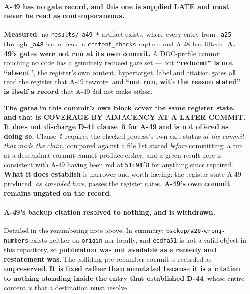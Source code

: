 \documentclass[
  10pt,
]{article}
\begin{document}
\paragraph{A-49 has no gate record, and this one is supplied LATE and must never be read as contemporaneous.}
\textbf{Measured}: no \texttt{results/\allowbreak{}\_a49\_*} artifact exists, where every entry from \texttt{\_a25} through \texttt{\_a48} has at least a \texttt{content\_checks} capture and A-48 has fifteen. \textbf{A-49's gates were not run at its own commit.} A DOC-profile commit touching no code has a genuinely reduced gate set --- but \textbf{``reduced'' is not ``absent''}, the register's own content, hypertarget, label and citation gates all read the register that A-49 rewrote, and \textbf{``not run, with the reason stated'' is itself a record} that A-49 did not make either.

\textbf{The gates in this commit's own block cover the same register state, and that is COVERAGE BY ADJACENCY AT A LATER COMMIT.} \textbf{It does not discharge D-41 clause~5 for A-49 and is not offered as doing so.} Clause~5 requires the checked process's own exit status \emph{at the commit that made the claim}, compared against a file list stated \emph{before} committing; a run at a descendant commit cannot produce either, and a green result here is consistent with A-49 having been red at \texttt{51c98f8} for anything since repaired. \textbf{What it does establish} is narrower and worth having: the register state A-49 produced, \emph{as amended here}, passes the register gates. \textbf{A-49's own commit remains ungated on the record.}

\paragraph{A-49's backup citation resolved to nothing, and is withdrawn.}
Detailed in the renumbering note above. In summary: \texttt{backup/a28-wrong-numbers} exists neither on \texttt{origin} nor locally, and \texttt{ecdfa51} is not a valid object in this repository, so \textbf{publication was not available as a remedy and restatement was}. The colliding pre-renumber commit is recorded as \textbf{unpreserved}. \textbf{It is fixed rather than annotated because it is a citation to nothing standing inside the entry that established D-44}, whose entire content is that a destination must resolve.
\end{document}
